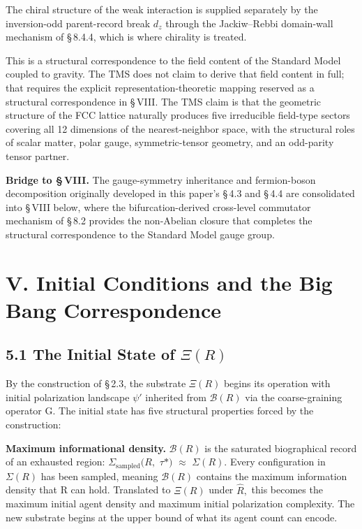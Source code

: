 \documentclass[11pt,oneside]{report}
\theoremstyle{definition}
\theoremstyle{remark}
\begin{document}
The chiral structure of the weak interaction is supplied separately by the
inversion-odd parent-record break \ensuremath{d_{z}} through the Jackiw--Rebbi
domain-wall mechanism of \S\,8.4.4, which is where chirality is treated.

This is a structural correspondence to the field content of the Standard
Model coupled to gravity. The TMS does not claim to derive that field
content in full; that requires the explicit representation-theoretic
mapping reserved as a structural correspondence in \S\,VIII. The TMS claim
is that the geometric structure of the FCC lattice naturally produces
five irreducible field-type sectors covering all 12 dimensions of the
nearest-neighbor space, with the structural roles of scalar matter,
polar gauge, symmetric-tensor geometry, and an odd-parity tensor
partner.

\textbf{Bridge to \S\,VIII.} The gauge-symmetry inheritance and
fermion-boson decomposition originally developed in this paper's \S\,4.3
and \S\,4.4 are consolidated into \S\,VIII below, where the
bifurcation-derived cross-level commutator mechanism of \S\,8.2 provides
the non-Abelian closure that completes the structural correspondence to
the Standard Model gauge group.

\section*{V. Initial Conditions and the Big Bang Correspondence}

\subsection*{5.1 The Initial State of \ensuremath{\Xi (R)}}

By the construction of \S\,2.3, the substrate \ensuremath{\Xi (R)} begins its operation
with initial polarization landscape \ensuremath{\psi '} inherited from \ensuremath{\mathcal{B}(R)} via the
coarse-graining operator G. The initial state has five structural
properties forced by the construction:

\textbf{Maximum informational density.} \ensuremath{\mathcal{B}(R)} is the saturated
biographical record of an exhausted region: \ensuremath{\Sigma_{\mathrm{sampled}}(R,} \ensuremath{\tau *)} \ensuremath{\approx} \ensuremath{\Sigma (R).}
Every configuration in \ensuremath{\Sigma (R)} has been sampled, meaning \ensuremath{\mathcal{B}(R)} contains the
maximum information density that R can hold. Translated to \ensuremath{\Xi (R)} under \ensuremath{\hat{R},}
this becomes the maximum initial agent density and maximum initial
polarization complexity. The new substrate begins at the upper bound of
what its agent count can encode.
\end{document}

